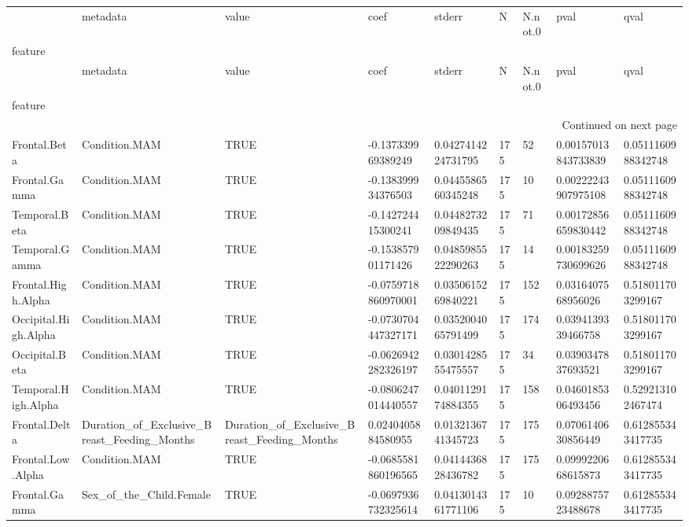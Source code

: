 \begin{longtable}{lllllllll}
\toprule
 & metadata & value & coef & stderr & N & N.not.0 & pval & qval \\
feature &  &  &  &  &  &  &  &  \\
\midrule
\endfirsthead
\toprule
 & metadata & value & coef & stderr & N & N.not.0 & pval & qval \\
feature &  &  &  &  &  &  &  &  \\
\midrule
\endhead
\midrule
\multicolumn{9}{r}{Continued on next page} \\
\midrule
\endfoot
\bottomrule
\endlastfoot
Frontal.Beta & Condition.MAM & TRUE & -0.137339969389249 & 0.0427414224731795 & 175 & 52 & 0.00157013843733839 & 0.0511160988342748 \\
Frontal.Gamma & Condition.MAM & TRUE & -0.138399934376503 & 0.0445586560345248 & 175 & 10 & 0.00222243907975108 & 0.0511160988342748 \\
Temporal.Beta & Condition.MAM & TRUE & -0.142724415300241 & 0.0448273209849435 & 175 & 71 & 0.00172856659830442 & 0.0511160988342748 \\
Temporal.Gamma & Condition.MAM & TRUE & -0.153857901171426 & 0.0485985522290263 & 175 & 14 & 0.00183259730699626 & 0.0511160988342748 \\
Frontal.High.Alpha & Condition.MAM & TRUE & -0.0759718860970001 & 0.0350615269840221 & 175 & 152 & 0.0316407568956026 & 0.518011703299167 \\
Occipital.High.Alpha & Condition.MAM & TRUE & -0.0730704447327171 & 0.0352004065791499 & 175 & 174 & 0.0394139339466758 & 0.518011703299167 \\
Occipital.Beta & Condition.MAM & TRUE & -0.0626942282326197 & 0.0301428555475557 & 175 & 34 & 0.0390347837693521 & 0.518011703299167 \\
Temporal.High.Alpha & Condition.MAM & TRUE & -0.0806247014440557 & 0.0401129174884355 & 175 & 158 & 0.0460185306493456 & 0.529213102467474 \\
Frontal.Delta & Duration\_of\_Exclusive\_Breast\_Feeding\_Months & Duration\_of\_Exclusive\_Breast\_Feeding\_Months & 0.0240405884580955 & 0.0132136741345723 & 175 & 175 & 0.0706140630856449 & 0.612855343417735 \\
Frontal.Low.Alpha & Condition.MAM & TRUE & -0.0685581860196565 & 0.0414436828436782 & 175 & 175 & 0.0999220668615873 & 0.612855343417735 \\
Frontal.Gamma & Sex\_of\_the\_Child.Female & TRUE & -0.0697936732325614 & 0.0413014361771106 & 175 & 10 & 0.0928875723488678 & 0.612855343417735 \\

\end{longtable}
